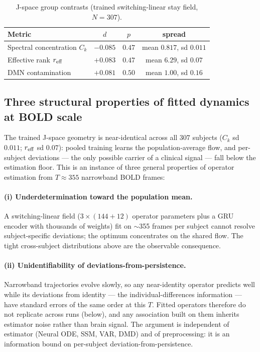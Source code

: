 \documentclass{article}
\begin{document}
\begin{table}[H]
\centering
\caption{J-space group contrasts (trained switching-linear stay field, $N{=}307$).}
\begin{tabular}{lccc}
\toprule
Metric & $d$ & $p$ & spread \\
\midrule
Spectral concentration $C_k$ & $-0.085$ & $0.47$ & mean $0.817$, sd $0.011$ \\
Effective rank $r_{\rm eff}$ & $+0.083$ & $0.47$ & mean $6.29$, sd $0.07$ \\
DMN contamination & $+0.081$ & $0.50$ & mean $1.00$, sd $0.16$ \\
\bottomrule
\end{tabular}
\label{tab:jspace}
\end{table}

\subsection{Three structural properties of fitted dynamics at BOLD scale}

The trained J-space geometry is near-identical across all $307$ subjects ($C_k$ sd $0.011$; $r_{\rm eff}$ sd $0.07$): pooled training learns the population-average flow, and per-subject deviations --- the only possible carrier of a clinical signal --- fall below the estimation floor. This is an instance of three general properties of operator estimation from $T{\approx}355$ narrowband BOLD frames:

\paragraph{(i) Underdetermination toward the population mean.}
A switching-linear field ($3\times(144{+}12)$ operator parameters plus a GRU encoder with thousands of weights) fit on $\sim$355 frames per subject cannot resolve subject-specific deviations; the optimum concentrates on the shared flow. The tight cross-subject distributions above are the observable consequence.

\paragraph{(ii) Unidentifiability of deviations-from-persistence.}
Narrowband trajectories evolve slowly, so any near-identity operator predicts well while its deviations from identity --- the individual-differences information --- have standard errors of the same order at this $T$. Fitted operators therefore do not replicate across runs (below), and any association built on them inherits estimator noise rather than brain signal. The argument is independent of estimator (Neural ODE, SSM, VAR, DMD) and of preprocessing: it is an information bound on per-subject deviation-from-persistence.
\end{document}

